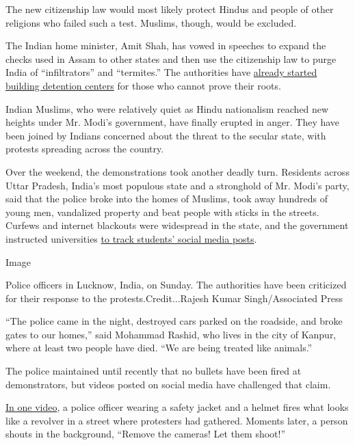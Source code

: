 The new citizenship law would most likely protect Hindus and people of
other religions who failed such a test. Muslims, though, would be
excluded.

The Indian home minister, Amit Shah, has vowed in speeches to expand the
checks used in Assam to other states and then use the citizenship law to
purge India of ``infiltrators'' and ``termites.'' The authorities have
\href{https://www.ndtv.com/india-news/assam-detention-centre-inside-indias-1st-detention-centre-for-illegal-immigrants-after-nrc-school-ho-2099626}{already
started building detention centers} for those who cannot prove their
roots.

Indian Muslims, who were relatively quiet as Hindu nationalism reached
new heights under Mr. Modi's government, have finally erupted in anger.
They have been joined by Indians concerned about the threat to the
secular state, with protests spreading across the country.

Over the weekend, the demonstrations took another deadly turn. Residents
across Uttar Pradesh, India's most populous state and a stronghold of
Mr. Modi's party, said that the police broke into the homes of Muslims,
took away hundreds of young men, vandalized property and beat people
with sticks in the streets. Curfews and internet blackouts were
widespread in the state, and the government instructed universities
\href{https://theprint.in/india/education/modi-govt-asks-iits-iims-varsities-to-track-student-social-media-posts-amid-caa-protests/338552/?fbclid=IwAR1kVcA0_t9XN_mvyBlEc8_BPdsfZQ8-cmNFvCQwcFNN-l35LQZ2uha1Q_o}{to
track students' social media posts}.

Image

Police officers in Lucknow, India, on Sunday. The authorities have been
criticized for their response to the protests.Credit...Rajesh Kumar
Singh/Associated Press

``The police came in the night, destroyed cars parked on the roadside,
and broke gates to our homes,'' said Mohammad Rashid, who lives in the
city of Kanpur, where at least two people have died. ``We are being
treated like animals.''

The police maintained until recently that no bullets have been fired at
demonstrators, but videos posted on social media have challenged that
claim.

\href{https://www.ndtv.com/india-news/citizenship-amendment-act-protests-video-suggests-up-cop-opened-fire-in-kanpur-contrary-to-no-police-2152566}{In
one video}, a police officer wearing a safety jacket and a helmet fires
what looks like a revolver in a street where protesters had gathered.
Moments later, a person shouts in the background, ``Remove the cameras!
Let them shoot!''

